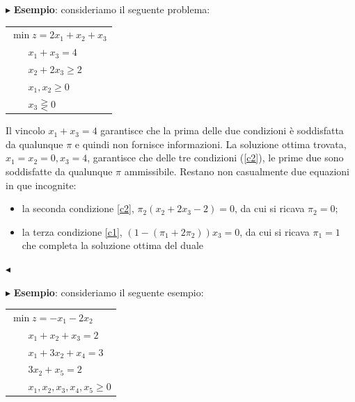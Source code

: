 \documentclass[11pt]{book}
\begin{document}
\vspace{11pt}
$\blacktriangleright$ {\bf Esempio}: consideriamo il seguente
problema:

\vspace{11pt}
\begin{center}
\begin{tabular}{l}
$\min z = 2x_1 + x_2 + x_3$\\
$\phantom{min}x_1 + x_3 = 4$\\
$\phantom{min}x_2 + 2x_3 \geq 2$\\
$\phantom{min}x_1, x_2 \geq 0$\\
$\phantom{min}x_3 \gtreqless 0$\\
\end{tabular}
\end{center}
\vspace{11pt}

Il vincolo $x_1 + x_3 = 4$ garantisce che la prima delle due
condizioni \`e soddisfatta da qualunque $\pi$ e quindi non fornisce
informazioni. La soluzione ottima trovata, $x_1 = x_2 = 0, x_3 = 4$,
garantisce che delle tre condizioni (\ref{c2}), le prime due sono
soddisfatte da qualunque $\pi$ ammissibile. Restano non casualmente
due equazioni in que incognite:

\begin{itemize}
\item la seconda condizione \ref{c2}, $\pi_2(x_2 + 2x_3 - 2) = 0$, da
  cui si ricava $\pi_2 = 0$;
\item la terza condizione \ref{c1}, $(1-(\pi_1 + 2\pi_2))x_3 = 0$, da
  cui si ricava $\pi_1 = 1$ che completa la soluzione ottima del
  duale
\end{itemize}
$\blacktriangleleft$
\vspace{11pt}

\vspace{11pt}
$\blacktriangleright$ {\bf Esempio}: consideriamo il seguente esempio:

\vspace{11pt}
\begin{center}
\begin{tabular}{l}
$\min z = -x_1 - 2x_2$\\
$\phantom{min}x_1 + x_2 + x_3 = 2$\\
$\phantom{min}x_1 + 3x_2 + x_4 = 3$\\
$\phantom{min}3x_2 + x_5 = 2$\\
$\phantom{min}x_1, x_2, x_3, x_4, x_5 \geq 0$\\
\end{tabular}
\end{center}
\vspace{11pt}
\end{document}
